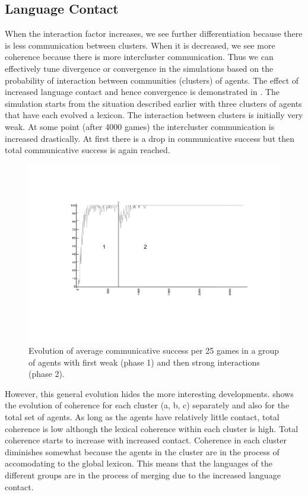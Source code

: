 \subsection{Language Contact}

When the interaction factor increases, we see further differentiation because
there is less communication between clusters. When it is decreased, we see more
coherence because there is more intercluster communication. Thus we can
effectively tune divergence or convergence in the simulations
based on the probability of interaction
between communities (clusters) of agents. The effect of 
increased language contact and hence convergence is demonstrated in 
. 
The simulation starts from the situation described earlier with three 
clusters of agents that have each evolved a lexicon. 
The interaction between clusters is initially
very weak. At some point (after 4000 games) the intercluster communication is
increased drastically. At first there is a drop in communicative
success but then total communicative success is again reached.

\begin{figure}[htbp]
  \centerline{\includegraphics[width=.65\textwidth]{chap5/figs/comm-succ}}
\caption{\footnotesize Evolution of average communicative success per 25 games
in a group of agents with first weak (phase 1) and then strong
interactions (phase 2).}
\label{figure-communicative-success-in-space}
\end{figure}

However, this general evolution hides the more interesting
developments. 
shows the evolution of coherence for each
cluster (a, b, c) separately and
also for the total set of agents. As long as the agents
have relatively little contact, total coherence is low
although the lexical coherence within each cluster is high. 
Total coherence starts to increase with increased contact. Coherence in
each cluster diminishes somewhat because the agents in the
cluster are in the process of accomodating to the global lexicon. 
This means that the
languages of the different groups are in the process of
merging due to the increased language contact.

